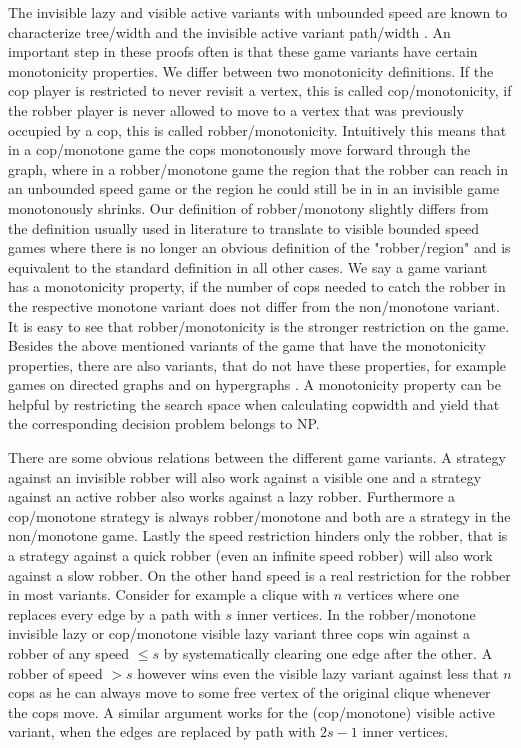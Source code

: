 The invisible lazy and visible active variants with unbounded speed are known to characterize tree\-/width \cite{dendris1997fugitive,seymour1993graph} and the invisible active variant path\-/width \cite{kirousis1985interval}.
An important step in these proofs often is that these game variants have certain monotonicity properties.
We differ between two monotonicity definitions.
If the cop player is restricted to never revisit a vertex, this is called cop\-/monotonicity, if the robber player is never allowed to move to a vertex that was previously occupied by a cop, this is called robber\-/monotonicity.
Intuitively this means that in a cop\-/monotone game the cops monotonously move forward through the graph, where in a robber\-/monotone game the region that the robber can reach in an unbounded speed game or the region he could still be in in an invisible game monotonously shrinks.
Our definition of robber\-/monotony slightly differs from the definition usually used in literature to translate to visible bounded speed games where there is no longer an obvious definition of the "robber\-/region" and is equivalent to the standard definition in all other cases.
We say a game variant has a monotonicity property, if the number of cops needed to catch the robber in the respective monotone variant does not differ from the non\-/monotone variant.
It is easy to see that robber\-/monotonicity is the stronger restriction on the game.
Besides the above mentioned variants of the game that have the monotonicity properties, there are also variants, that do not have these properties, for example games on directed graphs \cite{Kreutzer_digraph-decomp_2O11} and on hypergraphs \cite{Adler04}.
A monotonicity property can be helpful by restricting the search space when calculating copwidth and yield that the corresponding decision problem belongs to NP.

There are some obvious relations between the different game variants.
A strategy against an invisible robber will also work against a visible one and a strategy against an active robber also works against a lazy robber.
Furthermore a cop\-/monotone strategy is always robber\-/monotone and both are a strategy in the non\-/monotone game.
Lastly the speed restriction hinders only the robber, that is a strategy against a quick robber (even an infinite speed robber) will also work against a slow robber.
On the other hand speed is a real restriction for the robber in most variants.
Consider for example a clique with $n$ vertices where one replaces every edge by a path with $s$ inner vertices.
In the robber\-/monotone invisible lazy or cop\-/monotone visible lazy variant three cops win against a robber of any speed $\leq s$ by systematically clearing one edge after the other.
A robber of speed $>s$ however wins even the visible lazy variant against less that $n$ cops as he can always move to some free vertex of the original clique whenever the cops move.
A similar argument works for the (cop\-/monotone) visible active variant, when the edges are replaced by path with $2s-1$ inner vertices.

